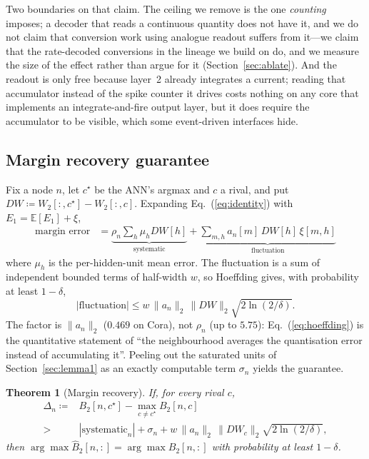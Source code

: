 \documentclass[10pt,twocolumn]{article}
\newtheorem{theorem}{Theorem}
\newcommand{\Btwo}{B_{2}}
\newcommand{\Btwohat}{\hat{B}_{2}}
\newcommand{\Eone}{E_{1}}
\newcommand{\anorm}{\lVert a_{n}\rVert_{2}}
\newcommand{\rhon}{\rho_{n}}
\newcommand{\Deltan}{\Delta_{n}}
\newcommand{\secref}[1]{Section~\ref{#1}}
\newcommand{\eqnref}[1]{Eq.~(\ref{#1})}
\begin{document}
Two boundaries on that claim. The ceiling we remove is the one \emph{counting} imposes; a decoder
that reads a continuous quantity does not have it, and we do not claim that conversion work using
analogue readout suffers from it---we claim that the rate-decoded conversions in the lineage we
build on do, and we measure the size of the effect rather than argue for it
(\secref{sec:ablate}). And the readout is only free because layer~2 already integrates a current;
reading that accumulator instead of the spike counter it drives costs nothing on any core that
implements an integrate-and-fire output layer, but it does require the accumulator to be visible,
which some event-driven interfaces hide.

\subsection{Margin recovery guarantee}
\label{sec:thm}

Fix a node $n$, let $c^{\star}$ be the ANN's argmax and $c$ a rival, and put
$DW \coloneqq W_{2}[:,c^{\star}] - W_{2}[:,c]$. Expanding \eqnref{eq:identity} with
$\Eone = \mathbb{E}[\Eone] + \xi$,
\begin{align}
\text{margin error}
&= \underbrace{\rhon \sum_{h} \mu_{h} DW[h]}_{\text{systematic}}
+ \underbrace{\sum_{m,h} a_{n}[m]\, DW[h]\, \xi[m,h]}_{\text{fluctuation}}
\label{eq:split}
\end{align}
where $\mu_{h}$ is the per-hidden-unit mean error. The fluctuation is a sum of independent bounded
terms of half-width $w$, so Hoeffding \citep{hoeffding1963probability} gives, with probability at
least $1-\delta$,
\begin{equation}
\left|\text{fluctuation}\right| \le w\,\anorm\,\lVert DW\rVert_{2}\sqrt{2\ln(2/\delta)} .
\label{eq:hoeffding}
\end{equation}
The factor is $\anorm$ ($0.469$ on Cora), not $\rhon$ (up to $5.75$): \eqnref{eq:hoeffding} is the
quantitative statement of ``the neighbourhood averages the quantisation error instead of accumulating
it''. Peeling out the saturated units of \secref{sec:lemma1} as an exactly computable term
$\sigma_{n}$ yields the guarantee.

\begin{theorem}[Margin recovery]
\label{thm:margin}
If, for every rival $c$,
\begin{equation}
\begin{split}
\Deltan \coloneqq {}&\Btwo[n,c^{\star}] - \max_{c \neq c^{\star}} \Btwo[n,c]\\
>{}& \left|\text{systematic}_{n}\right| + \sigma_{n}
+ w\,\anorm\,\lVert DW_{c}\rVert_{2}\sqrt{2\ln(2/\delta)},
\end{split}
\end{equation}
then $\arg\max \Btwohat[n,:] = \arg\max \Btwo[n,:]$ with probability at least $1-\delta$.
\end{theorem}
\end{document}
